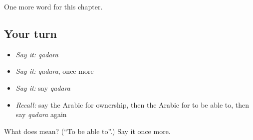 \begin{grammarlens}[title={What you've built}]
One more word for this chapter.
\end{grammarlens}

\subsection*{Your turn}
\begin{itemize}
\raggedright
  \item \emph{Say it:} \emph{qadara}
  \item \emph{Say it:} \emph{qadara}, once more
  \item \emph{Say it:} say \emph{qadara}
  \item \emph{Recall:} say the Arabic for ownership, then the Arabic for to be able to, then say \emph{qadara} again
\end{itemize}

\begin{tcolorbox}[breakable,colback=teal!4,colframe=teal!35!black,title={Before you move on}]
What does  mean? (\textquotedblleft{}To be able to\textquotedblright{}.) Say it once more.
\end{tcolorbox}
